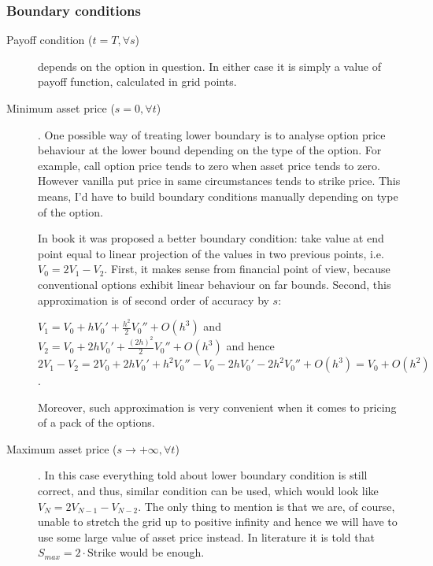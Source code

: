 \documentclass[11pt]{article} %
\begin{document}
\subsubsection{Boundary conditions}
\begin{description}
\item[Payoff condition ($t = T, \forall s$)] depends on the option in question. In either case it is simply a value of payoff function, calculated in grid points.
\item[Minimum asset price ($s = 0, \forall t$)]. One possible way of treating lower boundary is to analyse option price behaviour at the lower bound depending on the type of the option. For example, call option price tends to zero when asset price tends to zero. However vanilla put price in same circumstances tends to strike price. This means, I'd have to build boundary conditions manually depending on type of the option.

In book \cite[ch. ????]{PWoQF06} it was proposed a better boundary condition: take value at end point equal to linear projection of the values in two previous points, i.e. $V_0 = 2V_1 - V_2$. First, it makes sense from financial point of view, because conventional options exhibit linear behaviour on far bounds. Second, this approximation is of second order of accuracy by $s$:

$V_1 = V_0 + h V_0' + \frac{h^2}{2}V_0'' + O(h^3)$ and \\
$V_2 = V_0 + 2h V_0' + \frac{(2h)^2}{2}V_0'' + O(h^3)$ and hence \\
$2V_1 - V_2 = 2V_0 + 2h V_0' + h^2 V_0'' - V_0 - 2h V_0' - 2h^2V_0'' + O(h^3) = V_0 + O(h^2)$.

Moreover, such approximation is very convenient when it comes to pricing of a pack of the options. 

\item[Maximum asset price ($s \to +\infty, \forall t$)]. In this case everything told about lower boundary condition is still correct, and thus, similar condition can be used, which would look like $V_N = 2V_{N-1} - V_{N-2}$. The only thing to mention is that we are, of course, unable to stretch the grid up to positive infinity and hence we will have to use some large value of asset price instead. In literature it is told that $S_{max} = 2 \cdot \text{Strike}$ would be enough.  %
\end{description}
\end{document}
